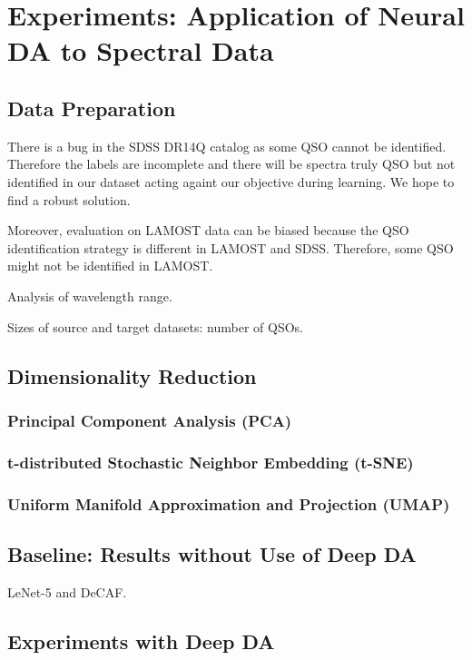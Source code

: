 \chapter{Experiments: Application of Neural DA to Spectral Data}
\label{exp_chapter}

\section{Data Preparation}

There is a bug in the SDSS DR14Q catalog as some QSO cannot be identified.
Therefore the labels are incomplete and there will be spectra truly QSO
but not identified in our dataset
acting againt our objective during learning.
We hope to find a robust solution.

Moreover, evaluation on LAMOST data can be biased
because the QSO identification strategy is different in LAMOST and SDSS.
Therefore, some QSO might not be identified in LAMOST.

Analysis of wavelength range.

Sizes of source and target datasets: number of QSOs.

\section{Dimensionality Reduction}

\subsection{Principal Component Analysis (PCA)}

\subsection{t-distributed Stochastic Neighbor Embedding (t-SNE)}

\subsection{Uniform Manifold Approximation and Projection (UMAP)}

\section{Baseline: Results without Use of Deep DA}

LeNet-5 and DeCAF.

\section{Experiments with Deep DA}

